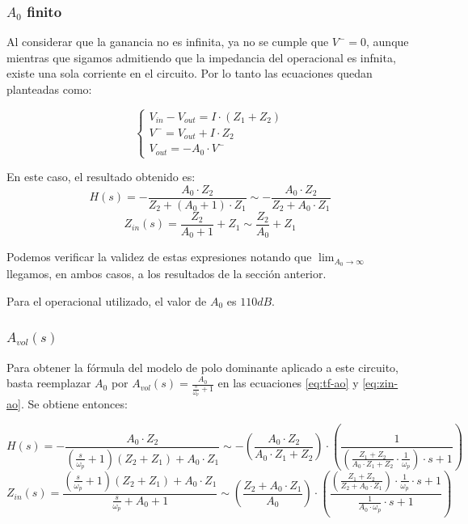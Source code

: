 \documentclass[../../main.tex]{subfiles}
\begin{document}
\subsubsection{$A_0$ finito}
Al considerar que la ganancia no es infinita, ya no se cumple que $V^-=0$, aunque mientras que sigamos admitiendo que la impedancia del operacional es infnita, existe una sola corriente en el circuito. Por lo tanto las ecuaciones quedan planteadas como:

 \[
	\left\{
 	\begin{array}{ll}
		V_{in} - V_{out} = I\cdot (Z_1+Z_2)\\
		V^- = V_{out} + I\cdot Z_2\\
		V_{out} = - A_0 \cdot V^-
	\end{array}
	\right.
 \]

En este caso, el resultado obtenido es:
\begin{equation} \label{eq:tf-ao} H(s) =-\frac{A_0\cdot Z_2}{Z_2+(A_0+1)\cdot Z_1} 
						\sim-\frac{A_0\cdot Z_2}{Z_2+A_0\cdot Z_1}  \end{equation}
\begin{equation} \label{eq:zin-ao} Z_{in}(s) = \frac{Z_2}{A_0+1} +Z_1 \sim  \frac{Z_2}{A_0} +Z_1 \end{equation}

Podemos verificar la validez de estas expresiones notando que $\lim_{A_0\to\infty}$ llegamos, en ambos casos, a los resultados de la secci\'on anterior.\par

Para el operacional utilizado, el valor de $A_0$ es $110dB$.

\subsubsection{$A_{vol}(s)$}
Para obtener la f\'ormula del modelo de polo dominante aplicado a este circuito, basta reemplazar $A_0$ por $A_{vol}(s)=\frac{A_0}{\frac{s}{\omega_p} +1}$ en las ecuaciones \ref{eq:tf-ao} y \ref{eq:zin-ao}. Se obtiene entonces:

\begin{equation} \label{eq:tf-avol} H(s) =-\frac{A_0\cdot Z_2}{\left(\frac{s}{\omega_p}+1\right)\left(Z_2+Z_1\right) + A_0 \cdot Z_1}  \sim
- \left(\frac{A_0 \cdot Z_2}{A_0 \cdot Z_1 + Z_2}\right) \cdot \left(\frac{1}{\left(\frac{Z_1 + Z_2}{A_0 \cdot Z_1 + Z_2} \cdot \frac{1}{\omega_p}\right) \cdot s + 1}\right)
\end{equation}
\begin{equation} \label{eq:zin-avol} Z_{in}(s) = \frac{\left(\frac{s}{\omega_p}+1\right)\left(Z_2+Z_1\right)+ A_0 \cdot Z_1}{\frac{s}{\omega_p}+A_0+1}
\sim \left(\frac{Z_2 + A_0 \cdot Z_1}{A_0}\right) \cdot \left(\frac{ \left(\frac{Z_1+Z_2}{Z_2+A_0\cdot Z_1}\right)\cdot \frac{1}{\omega_p} \cdot s + 1 }{ \frac{1} {A_0 \cdot \omega_p} \cdot s + 1}\right) \end{equation}
\end{document}
